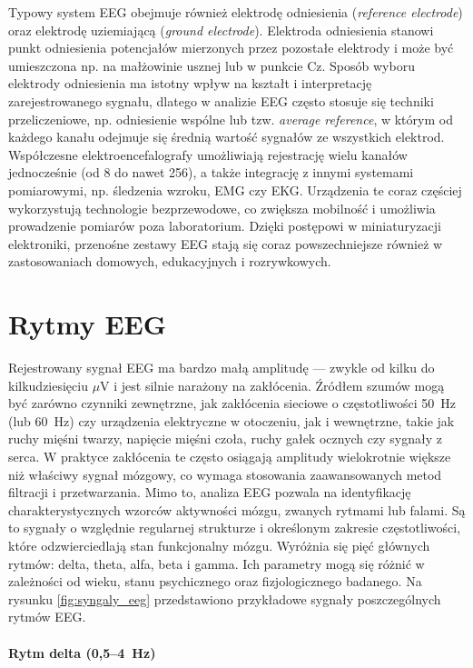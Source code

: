 Typowy system EEG obejmuje również elektrodę odniesienia (\textit{reference electrode}) oraz elektrodę uziemiającą (\textit{ground electrode}). Elektroda odniesienia stanowi punkt odniesienia potencjałów mierzonych przez pozostałe elektrody i może być umieszczona np. na małżowinie usznej lub w punkcie Cz. Sposób wyboru elektrody odniesienia ma istotny wpływ na kształt i interpretację zarejestrowanego sygnału, dlatego w analizie EEG często stosuje się techniki przeliczeniowe, np. odniesienie wspólne lub tzw. \textit{average reference}, w którym od każdego kanału odejmuje się średnią wartość sygnałów ze wszystkich elektrod. Współczesne elektroencefalografy umożliwiają rejestrację wielu kanałów jednocześnie (od 8 do nawet 256), a także integrację z innymi systemami pomiarowymi, np. śledzenia wzroku, EMG czy EKG. Urządzenia te coraz częściej wykorzystują technologie bezprzewodowe, co zwiększa mobilność i umożliwia prowadzenie pomiarów poza laboratorium. Dzięki postępowi w miniaturyzacji elektroniki, przenośne zestawy EEG stają się coraz powszechniejsze również w zastosowaniach domowych, edukacyjnych i rozrywkowych.

\section{Rytmy EEG}

Rejestrowany sygnał EEG ma bardzo małą amplitudę --- zwykle od kilku do kilkudziesięciu $\mu$V i jest silnie narażony na zakłócenia. Źródłem szumów mogą być zarówno czynniki zewnętrzne, jak zakłócenia sieciowe o częstotliwości 50~Hz (lub 60~Hz) czy urządzenia elektryczne w otoczeniu, jak i wewnętrzne, takie jak ruchy mięśni twarzy, napięcie mięśni czoła, ruchy gałek ocznych czy sygnały z serca. W praktyce zakłócenia te często osiągają amplitudy wielokrotnie większe niż właściwy sygnał mózgowy, co wymaga stosowania zaawansowanych metod filtracji i przetwarzania. Mimo to, analiza EEG pozwala na identyfikację charakterystycznych wzorców aktywności mózgu, zwanych rytmami lub falami. Są to sygnały o względnie regularnej strukturze i określonym zakresie częstotliwości, które odzwierciedlają stan funkcjonalny mózgu. Wyróżnia się pięć głównych rytmów: delta, theta, alfa, beta i gamma. Ich parametry mogą się różnić w zależności od wieku, stanu psychicznego oraz fizjologicznego badanego. Na rysunku \ref{fig:syngaly_eeg} przedstawiono przykładowe sygnały poszczególnych rytmów EEG.

\paragraph{Rytm delta (0,5--4~Hz)}


